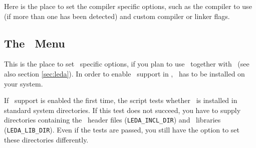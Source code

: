 Here is the place to set the compiler specific options, such as the
compiler to use (if more than one has been detected) and custom
compiler or linker flags.\bigskip


\subsection{The \leda\ Menu}\label{sec:leda-menu}

This is the place to set \leda\ specific options, if you plan to use
\leda\ together with \cgal\ (see also section \ref{sec:leda}). In
order to enable \leda\ support in \cgal, \leda\ has to be installed on
your system.

If \leda\ support is enabled the first time, the script tests whether
\leda\ is installed in standard system directories. If this test does
not succeed, you have to supply directories containing the \leda\ 
header files (\texttt{LEDA\_INCL\_DIR}) and
\leda\ libraries ({\tt LEDA\_LIB\_DIR})\TTindex{LEDA\_LIB\_DIR}.  Even
if the tests are passed, you still have the option to set these
directories differently.\bigskip


